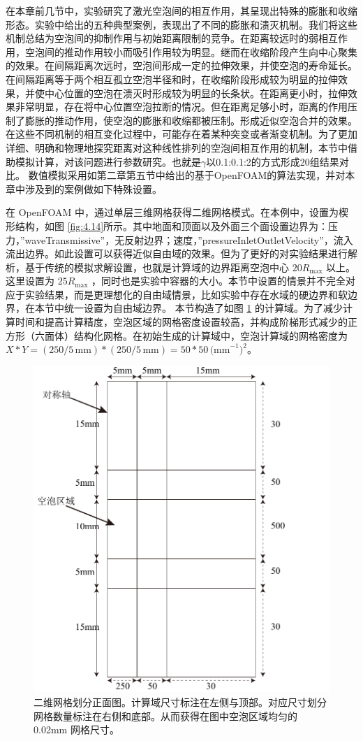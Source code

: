 在本章前几节中，实验研究了激光空泡间的相互作用，其呈现出特殊的膨胀和收缩形态。实验中给出的五种典型案例，表现出了不同的膨胀和溃灭机制。我们将这些机制总结为空泡间的抑制作用与初始距离限制的竞争。在距离较远时的弱相互作用，空泡间的推动作用较小而吸引作用较为明显。继而在收缩阶段产生向中心聚集的效果。在间隔距离次远时，空泡间形成一定的拉伸效果，并使空泡的寿命延长。在间隔距离等于两个相互孤立空泡半径和时，在收缩阶段形成较为明显的拉伸效果，并使中心位置的空泡在溃灭时形成较为明显的长条状。在距离更小时，拉伸效果非常明显，存在将中心位置空泡拉断的情况。但在距离足够小时，距离的作用压制了膨胀的推动作用，使空泡的膨胀和收缩都被压制。形成近似空泡合并的效果。
在这些不同机制的相互变化过程中，可能存在着某种突变或者渐变机制。为了更加详细、明确和物理地探究距离对这种线性排列的空泡间相互作用的机制，本节中借助模拟计算，对该问题进行参数研究。也就是$\gamma$以0.1:0.1:2的方式形成20组结果对比。
数值模拟采用如第二章第五节中给出的基于OpenFOAM的算法实现，并对本章中涉及到的案例做如下特殊设置。

在 OpenFOAM
中，通过单层三维网格获得二维网格模式。在本例中，设置为楔形结构，如图
\ref{fig:4.14}所示。其中地面和顶面以及外面三个面设置边界为：压力，''waveTransmissive''，无反射边界；速度，''pressureInletOutletVelocity''，流入流出边界。如此设置可以获得近似自由域的效果。但为了更好的对实验结果进行解析，基于传统的模拟求解设置，也就是计算域的边界距离空泡中心
$20 R_\mathrm{max}$ 以上。这里设置为 $25 R_\mathrm{max}$
，同时也是实验中容器的大小。本节中设置的情景并不完全对应于实验结果，而是更理想化的自由域情景，比如实验中存在水域的硬边界和软边界，在本节中统一设置为自由域边界。
本节构造了如图 \ref{fig:4.15}
的计算域。为了减少计算时间和提高计算精度，空泡区域的网格密度设置较高，并构成阶梯形式减少的正方形（六面体）结构化网格。在初始生成的计算域中，空泡计算域的网格密度为
$X*Y=(250/5\,\mathrm{mm})*(250/5\,\mathrm{mm})=50*50\,\mathrm{(mm}^{-1})^2$。

\begin{figure}[H]
    \centering
    \includegraphics[width=0.5\linewidth]{img/fig4.15.pdf}
    \caption[二维网格划分正面图。]{二维网格划分正面图。计算域尺寸标注在左侧与顶部。对应尺寸划分网格数量标注在右侧和底部。从而获得在图中空泡区域均匀的
0.02mm 网格尺寸。}
    \label{fig:4.15}
\end{figure}


